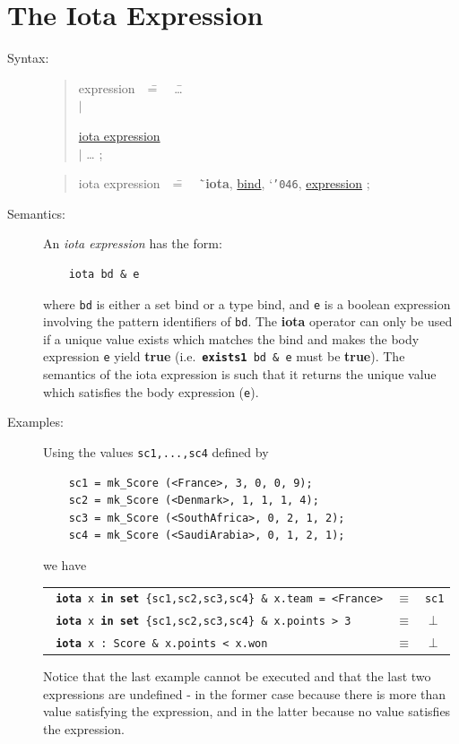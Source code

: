\documentclass{overturerepchap}
\newcommand{\Lit}[1]{`{\tt #1}\Quote}
\newcommand{\Rule}[2]{
  \begin{quote}\begin{tabbing}
    #1\index{#1}\ \ \= = \ \ \= #2  ; %
    
  \end{tabbing}\end{quote}
  }
\newcommand{\Ruleref}[1]{
  \hyperlink{rule:#1}{#1}}
\newcommand{\dsep}{\\ \> $|$ \>}
\newcommand{\Lop}[1]{`{\bf\ttfamily #1}\Quote}
\newcommand{\keyw}[1]{{\bf\ttfamily #1}}
\begin{document}
\section{The Iota Expression}\label{iotaexpr}

\begin{description}
\item[Syntax:]
  \Rule{expression}{
    \ldots \dsep
    \Ruleref{iota expression} \dsep
    \ldots
    }

  \Rule{iota expression}{
    \Lop{iota}, \Ruleref{bind}, \Lit{\char'046}, \Ruleref{expression}
    }

\item[Semantics:] An {\it iota expression} has the form:
  \begin{lstlisting}
    iota bd & e
  \end{lstlisting}
  where {\tt bd} is either a set bind or a type bind, and {\tt e} is a
  boolean expression involving the pattern identifiers of {\tt bd}.
  The \keyw{iota} operator can only be used if a unique value exists
  which matches the bind and makes the body expression {\tt e} yield
  \keyw{true} (i.e.\ {\tt \keyw{exists1} bd \& e} must be \keyw{true}). The
  semantics of the iota expression is such that it returns the unique
  value which satisfies the body expression ({\tt e}).

\item[Examples:]
  Using the values \texttt{sc1,...,sc4} defined by
  \begin{lstlisting}
    sc1 = mk_Score (<France>, 3, 0, 0, 9);
    sc2 = mk_Score (<Denmark>, 1, 1, 1, 4);
    sc3 = mk_Score (<SouthAfrica>, 0, 2, 1, 2);
    sc4 = mk_Score (<SaudiArabia>, 0, 1, 2, 1);
  \end{lstlisting}
  we have
  
  \begin{tabular}{lcl}
    \texttt{ \keyw{iota} x \keyw{in set} \{sc1,sc2,sc3,sc4\} \& 
      x.team = <France>} & $\equiv$ & \texttt{sc1}\\
    \texttt{ \keyw{iota} x \keyw{in set} \{sc1,sc2,sc3,sc4\} \& 
      x.points > 3} & $\equiv$ & $\perp$\\
    \texttt{ \keyw{iota} x : Score \& x.points < x.won} & $\equiv$ &
  $\perp$
  \end{tabular}

  \noindent Notice that the last example cannot be executed and that
  the last two expressions are undefined - in the former case because
  there is more than value satisfying the expression, and in the
  latter because no value satisfies the expression.
\end{description}
\end{document}
